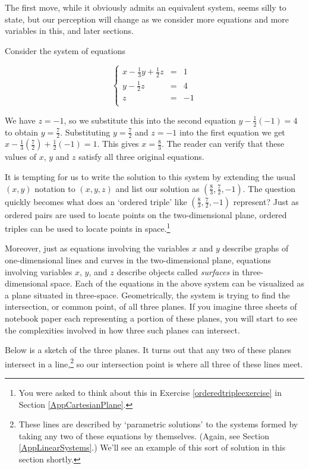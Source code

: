\smallskip

 The first move, while it obviously admits an equivalent system, seems silly to state, but our perception will change as we consider more equations and more variables in this, and later sections.

\smallskip

Consider the system of equations 

\[ \left\{ \begin{array}{rcr} x-\frac{1}{3}y+\frac{1}{2}z  & = & 1 \\ [3pt]
y - \frac{1}{2} z & = & 4 \\ [3pt]
z & = & -1 \\ \end{array} \right.\]  

We have $z = -1$, so we substitute this into the second equation $y - \frac{1}{2} (-1) = 4$ to obtain $y = \frac{7}{2}$.  Substituting $y = \frac{7}{2}$ and $z=-1$ into the first equation we get $x - \frac{1}{3}\left(\frac{7}{2}\right) + \frac{1}{2}(-1) = 1$.  This gives $x = \frac{8}{3}$.  The reader can verify that these values of $x$, $y$ and $z$ satisfy all three original equations.  

It is tempting for us to write the solution to this system by extending the usual $(x,y)$ notation to $(x,y,z)$ and list our solution as $\left(\frac{8}{3},\frac{7}{2},-1\right)$.  The question quickly becomes what does an `ordered triple' like $\left(\frac{8}{3},\frac{7}{2},-1\right)$ represent?  Just as ordered pairs are used to locate points on the two-dimensional plane, ordered triples can be used to locate points in space.\footnote{You were asked to think about this in Exercise \ref{orderedtripleexercise} in Section \ref{AppCartesianPlane}.}  

Moreover, just as equations involving the variables $x$ and $y$ describe graphs of one-dimensional lines and curves in the two-dimensional plane, equations involving variables $x$, $y$, and $z$ describe objects called \textit{surfaces} in three-dimensional space.  Each of the equations in the above system can be visualized as a plane situated in three-space.  Geometrically, the system is trying to find the intersection, or common point, of all three planes. If you imagine three sheets of notebook paper each representing a portion of these planes, you will start to see the complexities involved in how three such planes can intersect. 

Below is a sketch of the three planes.  It turns out that any two of these planes intersect in a line,\footnote{These lines are described by `parametric solutions' to the systems formed by taking any two of these equations by themselves.  (Again, see Section \ref{AppLinearSystems}.) We'll see an example of this sort of solution in this section shortly.} so our intersection point is where all three of these lines meet. 

